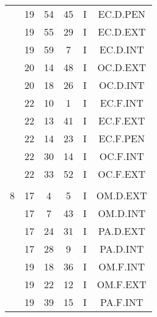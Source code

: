 \documentclass[12pt, a4paper]{article}
\begin{document}
\begin{multicols}{3}
{\begin{tabular}{c c c c c c}
	 	 	 	 & 19 & 54 & 45 & I & EC.D.PEN\\%
	 	 	 	 & 19 & 55 & 29 & I & EC.D.EXT\\%
	 	 	 	 & 19 & 59 & 7 & I & EC.D.INT\\%
	 	 	 	 & 20 & 14 & 48 & I & OC.D.EXT\\%
	 	 	 	 & 20 & 18 & 26 & I & OC.D.INT\\%
	 	 	 	 & 22 & 10 & 1 & I & EC.F.INT\\%
	 	 	 	 & 22 & 13 & 41 & I & EC.F.EXT\\%
	 	 	 	 & 22 & 14 & 23 & I & EC.F.PEN\\%
	 	 	 	 & 22 & 30 & 14 & I & OC.F.INT\\%
	 	 	 	 & 22 & 33 & 52 & I & OC.F.EXT\\%
	 	 	 	 & & & & & \\%
	 	 	 	8 & 17 & 4 & 5 & I & OM.D.EXT\\%
	 	 	 	 & 17 & 7 & 43 & I & OM.D.INT\\%
	 	 	 	 & 17 & 24 & 31 & I & PA.D.EXT\\%
	 	 	 	 & 17 & 28 & 9 & I & PA.D.INT\\%
	 	 	 	 & 19 & 18 & 36 & I & OM.F.INT\\%
	 	 	 	 & 19 & 22 & 12 & I & OM.F.EXT\\%
	 	 	 	 & 19 & 39 & 15 & I & PA.F.INT\\%
	 	 \end{tabular}
 	}
\end{multicols}
\end{document}
